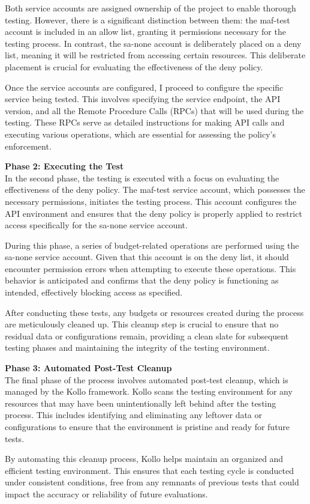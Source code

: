 Both service accounts are assigned ownership of the project to enable thorough testing. However, there is a significant distinction between them: the maf-test account is included in an allow list, granting it permissions necessary for the testing process. In contrast, the sa-none account is deliberately placed on a deny list, meaning it will be restricted from accessing certain resources. This deliberate placement is crucial for evaluating the effectiveness of the deny policy.

Once the service accounts are configured, I proceed to configure the specific service being tested. This involves specifying the service endpoint, the API version, and all the Remote Procedure Calls (RPCs) that will be used during the testing. These RPCs serve as detailed instructions for making API calls and executing various operations, which are essential for assessing the policy's enforcement.

\textbf{Phase 2: Executing the Test}\\
In the second phase, the testing is executed with a focus on evaluating the effectiveness of the deny policy. The maf-test service account, which possesses the necessary permissions, initiates the testing process. This account configures the API environment and ensures that the deny policy is properly applied to restrict access specifically for the sa-none service account.

During this phase, a series of budget-related operations are performed using the sa-none service account. Given that this account is on the deny list, it should encounter permission errors when attempting to execute these operations. This behavior is anticipated and confirms that the deny policy is functioning as intended, effectively blocking access as specified.

After conducting these tests, any budgets or resources created during the process are meticulously cleaned up. This cleanup step is crucial to ensure that no residual data or configurations remain, providing a clean slate for subsequent testing phases and maintaining the integrity of the testing environment.

\textbf{Phase 3: Automated Post-Test Cleanup}\\
The final phase of the process involves automated post-test cleanup, which is managed by the Kollo framework. Kollo scans the testing environment for any resources that may have been unintentionally left behind after the testing process. This includes identifying and eliminating any leftover data or configurations to ensure that the environment is pristine and ready for future tests.

By automating this cleanup process, Kollo helps maintain an organized and efficient testing environment. This ensures that each testing cycle is conducted under consistent conditions, free from any remnants of previous tests that could impact the accuracy or reliability of future evaluations.
\newpage

